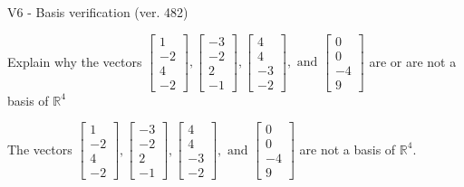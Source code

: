 \begin{exercise}
  \begin{exerciseTitle}V6 - Basis verification (ver. 482)\end{exerciseTitle}
  \begin{exerciseStatement}
    Explain why the vectors \(\left[\begin{array}{r}
1 \\
-2 \\
4 \\
-2
\end{array}\right] , \left[\begin{array}{r}
-3 \\
-2 \\
2 \\
-1
\end{array}\right] , \left[\begin{array}{r}
4 \\
4 \\
-3 \\
-2
\end{array}\right] , \text{ and } \left[\begin{array}{r}
0 \\
0 \\
-4 \\
9
\end{array}\right]\) are or are not a basis of \(\mathbb{R}^4\)	


  \end{exerciseStatement}
  \begin{exerciseAnswer}
   The vectors \(\left[\begin{array}{r}
1 \\
-2 \\
4 \\
-2
\end{array}\right] , \left[\begin{array}{r}
-3 \\
-2 \\
2 \\
-1
\end{array}\right] , \left[\begin{array}{r}
4 \\
4 \\
-3 \\
-2
\end{array}\right] , \text{ and } \left[\begin{array}{r}
0 \\
0 \\
-4 \\
9
\end{array}\right]\) 
  	 are not  a basis of \(\mathbb{R}^4\).
  


  \end{exerciseAnswer}
\end{exercise}